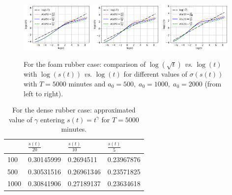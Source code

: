 \documentclass{article}
\begin{document}
\begin{figure}[h!]
	\centering
	\includegraphics[width=0.32\textwidth]{Foam_Large_Loglog_a0_500.png}
	\hspace{0.1cm}
	\includegraphics[width=0.32\textwidth]{Foam_Large_Loglog_a0_1000.png}
	\hspace{0.1cm}
	\includegraphics[width=0.32\textwidth]{Foam_Large_Loglog_a0_2000.png}
	\caption{ For the foam rubber case: comparison of $\log(\sqrt{t})$ \textit{vs}. $\log(t)$ with  $\log(s(t))$ \textit{vs}. $\log(t)$ for different values of $\sigma(s(t))$ with $T = 5000$ minutes and $a_0 = 500, \;a_0 =  1000, \;a_0 =  2000$ (from left to right).}
	\label{Fig:23}
\end{figure}




\begin {table}[h]
\begin{center}
		\begin{tabular}{ |p{2.5cm}|p{2cm}|p{2cm}| p{2cm}|}
			\hline
			\diagbox{$a_0$}{$\sigma(s(t))$} & $\frac{s(t)}{20}$&$\frac{s(t)}{10}$& $\frac{s(t)}{5}$\\
			\hline
			100  & 0.30145999& 0.2694511 & 0.23967876 \\
			500  &0.30531516 & 0.26961346 & 0.23571825\\
			1000&0.30841906& 0.27189137 &0.23634618 \\
			\hline
		\end{tabular}
		\caption {For the  dense rubber case: approximated value of  $\gamma$ entering $s(t) = t^\gamma$ for $T = 5000$ minutes.}
		\label{tab:2} 
	\end{center}
	\end {table}
\end{document}
